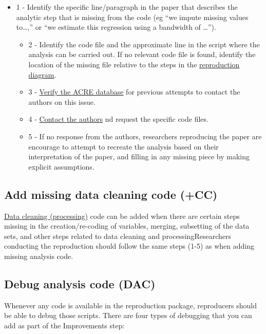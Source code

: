 \documentclass[]{book}
\begin{document}
\begin{itemize}
\item
  1 - Identify the specific line/paragraph in the paper that describes the analytic step that is missing from the code (eg ``we impute missing values to\ldots{},'' or ``we estimate this regression using a bandwidth of \ldots{}'').

  \begin{itemize}
  \item
    2 - Identify the code file and the approximate line in the script where the analysis can be carried out. If no relevant code file is found, identify the location of the missing file relative to the steps in the \protect\hyperlink{diagram}{reproduction diagram}.
  \item
    3 - \href{ADD\%20LINK}{Verify the ACRE database} for previous attempts to contact the authors on this issue.
  \item
    4 - \protect\hyperlink{tips-for-communication}{Contact the authors} nd request the specific code files.
  \item
    5 - If no response from the authors, researchers reproducing the paper are encourage to attempt to recreate the analysis based on their interpretation of the paper, and filling in any missing piece by making explicit assumptions.
  \end{itemize}
\end{itemize}

\hypertarget{cc}{%
\subsection{Add missing data cleaning code (+CC)}\label{cc}}

\protect\hyperlink{describe-inputs}{Data cleaning (processing)} code can be added when there are certain steps missing in the creation/re-coding of variables, merging, subsetting of the data sets, and other steps related to data cleaning and processingResearchers conducting the reproduction should follow the same steps (1-5) as when adding missing analysis code.

\hypertarget{dac}{%
\subsection{Debug analysis code (DAC)}\label{dac}}

Whenever any code is available in the reproduction package, reproducers should be able to debug those scripts. There are four types of debugging that you can add as part of the Improvements step:
\end{document}
